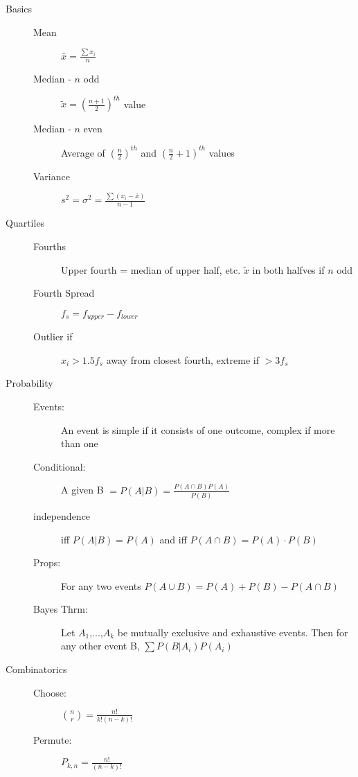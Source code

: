 \documentclass[12pt]{letter}
\begin{document}
\begin{multicols}{2}
\begin{description}
  \item[Basics]
    \begin{description}
    \item[Mean] $\bar{x} = \frac{\sum x_i}{n}$
    \item[Median - $n$ odd] $\tilde{x} = \left( \frac{n+1}{2} \right)^{th}$ value
    \item[Median - $n$ even] Average of $\left( \frac{n}{2} \right)^{th}$ and $\left( \frac{n}{2} + 1\right)^{th}$ values
    \item[Variance] $s^2 = \sigma^2 = \frac{\sum(x_i - \bar{x})}{n-1}$
    \end{description}

  \item[Quartiles]
    \begin{description}
    \item[Fourths] Upper fourth = median of upper half, etc.  $\tilde{x}$ in both halfves if $n$ odd
    \item[Fourth Spread] $f_s = f_{upper} - f_{lower}$
    \item[Outlier if] $x_i > 1.5f_s$ away from closest fourth, extreme if $> 3f_s$  
    \end{description}

  \item[Probability]

    \begin{description}
    \item[Events:] An event is simple if it consists of one outcome, complex if more than one
    \item[Conditional:] A given B $ = P(A|B) = \frac{P(A \cap B)P(A)}{P(B)}$
    \item[independence] iff $P(A|B) = P(A)$ and iff $P(A \cap B) = P(A)\cdot P(B)$
    \item[Props:]For any two events $P(A \cup B) = P(A) + P(B) - P(A \cap B)$
    \item[Bayes Thrm:] Let $A_1$,...,$A_k$ be mutually exclusive and exhaustive events. Then for any other event B, $\sum P(B|A_i)P(A_i)$
    \end{description}

  \item[Combinatorics]
    \begin{description}
    \item[Choose:] ${n \choose r} = \frac{n!}{k!(n-k)!}$
    \item[Permute:] $P_{k,n} = \frac{n!}{(n-k)!}$
    \end{description}


\end{description}
\end{multicols}
\end{document}
